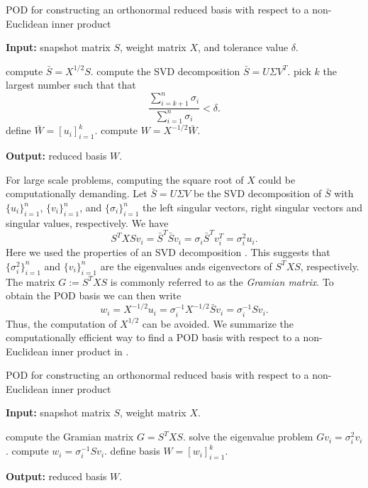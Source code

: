 \begin{algorithm} 
	\caption{POD for constructing an orthonormal reduced basis with respect to a non-Euclidean inner product} \label{alg:3.2}
	\textbf{Input:} snapshot matrix $S$, weight matrix $X$, and tolerance value $\delta$.
	\begin{algorithmic} [1]
		\State compute $\bar S = X^{1/2} S$.
		\State compute the SVD decomposition $\bar S = U \Sigma V^T$.
		\State pick $k$ the largest number such that that
		\[
			\frac{\sum_{i=k+1}^n \sigma_i}{\sum_{i=1}^n \sigma_i} < \delta.
		\]
		\State define $\bar W = [u_i]_{i=1}^k$.
		\State compute $W = X^{-1/2} \bar W$.
	\end{algorithmic}
	\vspace{0.5cm}
	\textbf{Output:} reduced basis $W$.
\end{algorithm}
For large scale problems, computing the square root of $X$ could be computationally demanding. Let $\bar S = U\Sigma V$ be the SVD decomposition of $\bar S$ with $\{u_i\}_{i=1}^{n}$, $\{v_i\}_{i=1}^{n}$, and $\{ \sigma_i \}_{i=1}^n$ the left singular vectors, right singular vectors and singular values, respectively. We have
\begin{equation} \label{eq:3.23}
	S^TXS v_i = \bar S^T \bar S v_i = \sigma_i \bar S^T v_i^T = \sigma_i^2 u_i. 
\end{equation}
Here we used the properties of an SVD decomposition \cite{trefethen97}. This suggests that $\{\sigma_i^2\}_{i=1}^{n}$ and $\{v_i\}_{i=1}^n$ are the eigenvalues ands eigenvectors of $S^TXS$, respectively. The matrix $G:=S^TXS$ is commonly referred to as the \emph{Gramian matrix}. To obtain the POD basis we can then write
\begin{equation} \label{eq:3.24}
	w_i = X^{-1/2} u_i = \sigma_i^{-1} X^{-1/2} \bar S v_i = \sigma_i^{-1} S v_i.
\end{equation}
Thus, the computation of $X^{1/2}$ can be avoided. We summarize the computationally efficient way to find a POD basis with respect to a non-Euclidean inner product in .

\begin{algorithm} 
	\caption{POD for constructing an orthonormal reduced basis with respect to a non-Euclidean inner product} \label{alg:3.3}
	\textbf{Input:} snapshot matrix $S$, weight matrix $X$.
	\begin{algorithmic} [1]
		\State compute the Gramian matrix $ G = S^TXS$.
		\State solve the eigenvalue problem $Gv_i = \sigma_i^2 v_i$. 
		\State compute $w_i = \sigma_i^{-1} S v_i$.
		\State define basis $W = [w_i]_{i=1}^k$.
	\end{algorithmic}
	\vspace{0.5cm}
	\textbf{Output:} reduced basis $W$.
\end{algorithm}

